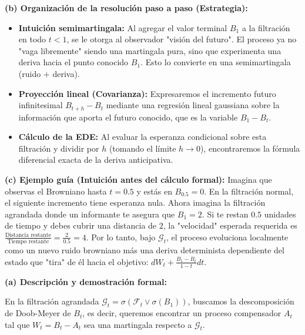 \documentclass[11pt, letterpaper]{article}
\begin{document}
\vspace{5mm}

\begin{solucion}
    \textbf{(b) Organización de la resolución paso a paso (Estrategia):}
    \begin{itemize}
        \item[(i)] \textbf{Intuición semimartingala:} Al agregar el valor terminal $B_1$ a la filtración en todo $t < 1$, se le otorga al observador "visión del futuro". El proceso ya no "vaga libremente" siendo una martingala pura, sino que experimenta una deriva hacia el punto conocido $B_1$. Esto lo convierte en una semimartingala (ruido $+$ deriva).
        \item[(ii)] \textbf{Proyección lineal (Covarianza):} Expresaremos el incremento futuro infinitesimal $B_{t+h} - B_t$ mediante una regresión lineal gaussiana sobre la información que aporta el futuro conocido, que es la variable $B_1 - B_t$.
        \item[(iii)] \textbf{Cálculo de la EDE:} Al evaluar la esperanza condicional sobre esta filtración y dividir por $h$ (tomando el límite $h \to 0$), encontraremos la fórmula diferencial exacta de la deriva anticipativa.
    \end{itemize}

    \vspace{3mm}
    \textbf{(c) Ejemplo guía (Intuición antes del cálculo formal):}
    Imagina que observas el Browniano hasta $t=0.5$ y estás en $B_{0.5} = 0$. En la filtración normal, el siguiente incremento tiene esperanza nula. 
    Ahora imagina la filtración agrandada donde un informante te asegura que $B_1 = 2$. Si te restan $0.5$ unidades de tiempo y debes cubrir una distancia de $2$, la "velocidad" esperada requerida es $\frac{\text{Distancia restante}}{\text{Tiempo restante}} = \frac{2}{0.5} = 4$.
    Por lo tanto, bajo $\mathcal{G}_t$, el proceso evoluciona localmente como un nuevo ruido browniano más una deriva determinista dependiente del estado que "tira" de él hacia el objetivo: $dW_t + \frac{B_1 - B_t}{1 - t}dt$.

    \vspace{3mm}
    \textbf{(a) Descripción y demostración formal:}

    En la filtración agrandada $\mathcal{G}_t = \sigma(\mathcal{F}_t \vee \sigma(B_1))$, buscamos la descomposición de Doob-Meyer de $B_t$, es decir, queremos encontrar un proceso compensador $A_t$ tal que $W_t = B_t - A_t$ sea una martingala respecto a $\mathcal{G}_t$.


\end{solucion}
\end{document}
